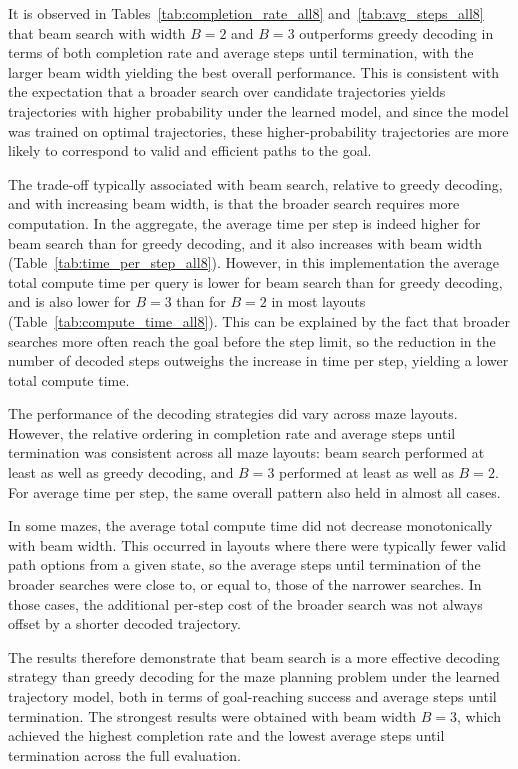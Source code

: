 ﻿\documentclass[12pt,a4paper]{article}
\theoremstyle{definition}
\begin{document}
It is observed in Tables~\ref{tab:completion_rate_all8} and~\ref{tab:avg_steps_all8} that beam
search with width $B=2$ and $B=3$ outperforms greedy decoding in terms of both completion rate and average steps until termination,
with the larger beam width yielding the best overall performance. This is consistent with the
expectation that a broader search over candidate trajectories yields trajectories with higher
probability under the learned model, and since the model was trained on optimal trajectories,
these higher-probability trajectories are more likely to correspond to valid and efficient paths
to the goal.

The trade-off typically associated with beam search, relative to greedy decoding, and with
increasing beam width, is that the broader search requires more computation. In the aggregate, the
average time per step is indeed higher for beam search than for greedy decoding, and it also
increases with beam width (Table~\ref{tab:time_per_step_all8}). However, in this
implementation the average total compute time per query
is lower for beam search than for greedy
decoding, and is also lower for $B=3$ than for $B=2$ in most layouts
(Table~\ref{tab:compute_time_all8}). This can be explained by the fact that
broader searches more often reach the goal before the step limit, so the reduction in the number of
decoded steps outweighs the increase in time per step, yielding a lower total compute time.

The performance of the decoding strategies did vary across maze layouts. However, the relative ordering in completion rate and average
steps until termination was consistent across all maze layouts: beam search performed at least as well as
greedy decoding, and $B=3$ performed at least as well as $B=2$. For average time per step, the same overall pattern also
held in almost all cases. 

In some mazes, the average total compute time did not decrease monotonically with beam width. This
occurred in layouts where there were typically fewer valid path options from a given state, so the
average steps until termination of the broader searches were close to, or equal to, those of the narrower
searches. In those cases, the additional per-step cost of the broader search was not always offset
by a shorter decoded trajectory.

The results therefore demonstrate that beam search is a more effective decoding strategy than greedy
decoding for the maze planning problem under the learned trajectory model, both in terms of
goal-reaching success and average steps until termination. The strongest results were obtained with beam width
$B=3$, which achieved the highest completion rate and the lowest average steps until termination across the
full evaluation.
\end{document}
